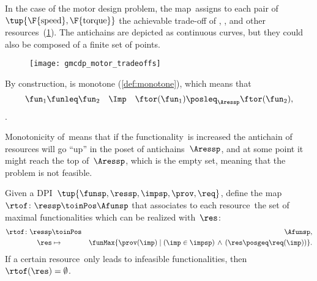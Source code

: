 \begin{example}
    In the case of the motor design problem, the map~\ftor assigns
    to each pair of~$\tup{\F{\text{speed}},\F{\text{torque}}}$
    the achievable trade-off of , , and other resources~(\cref{fig:motor-trade-offs}).
    The antichains are depicted as continuous curves, but they could also
    be composed of a finite set of points.

\end{example}
\begin{figure}
    \texttt{[image: gmcdp\_motor\_tradeoffs]}
    \caption{}
    \label{fig:motor-trade-offs}
\end{figure}

By construction, \ftor is monotone (\cref{def:monotone}), which means that
\begin{equation*}
    \fun_{1}\funleq\fun_{2}\quad\Imp\quad\ftor(\fun_{1})\posleq_{\Aressp}\ftor(\fun_{2}),
\end{equation*}.


Monotonicity of~\ftor means that if the functionality~\fun is increased the antichain of resources will go ``up'' in the poset of antichains~$\Aressp$,
and at some point it might reach the top of~$\Aressp$, which is the empty set, meaning that the problem is not feasible.

\begin{definition}
    \label{def:rtof}
    Given a DPI~$\tup{ \funsp,\ressp,\impsp,\prov,\req}$,
    define the map~$\rtof\colon \ressp\toinPos \Afunsp$ that associates
    to each resource~\res the set of maximal functionalities which can be realized with~$\res$:
    \begin{eqnarray*}
        \rtof\colon \ressp & \toinPos & \Afunsp,\\
        \res& \mapsto & \funMax\{\prov(\imp)\mid\left(\imp\in\impsp\right)\,\wedge\,\left(\res\posgeq\req(\imp)\right)\}.
    \end{eqnarray*}
    If a certain resource~\res only leads to infeasible functionalities, then~$\rtof(\res)=\emptyset$.
\end{definition}


